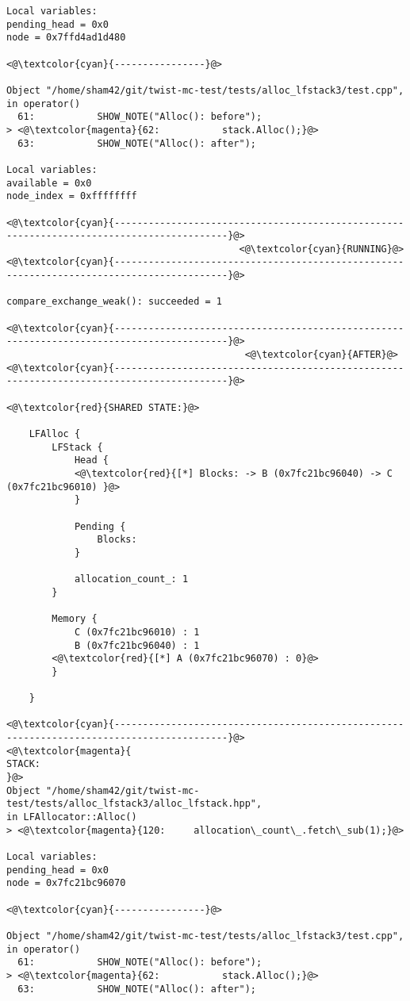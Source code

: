 \begin{adjustwidth}{-3.3cm}{-1cm}
\begin{allintypewriter}
\begin{multicols*}{2}
\begin{lstlisting}[numbers=none]
Local variables: 
pending_head = 0x0
node = 0x7ffd4ad1d480

<@\textcolor{cyan}{----------------}@>

Object "/home/sham42/git/twist-mc-test/tests/alloc_lfstack3/test.cpp",
in operator()
  61:           SHOW_NOTE("Alloc(): before");
> <@\textcolor{magenta}{62:           stack.Alloc();}@>
  63:           SHOW_NOTE("Alloc(): after");

Local variables: 
available = 0x0
node_index = 0xffffffff

<@\textcolor{cyan}{------------------------------------------------------------------------------------------}@>
                                         <@\textcolor{cyan}{RUNNING}@>
<@\textcolor{cyan}{------------------------------------------------------------------------------------------}@>

compare_exchange_weak(): succeeded = 1

<@\textcolor{cyan}{------------------------------------------------------------------------------------------}@>
                                          <@\textcolor{cyan}{AFTER}@>
<@\textcolor{cyan}{------------------------------------------------------------------------------------------}@>

<@\textcolor{red}{SHARED STATE:}@>

    LFAlloc {
	    LFStack {
		    Head {
			<@\textcolor{red}{[*] Blocks: -> B (0x7fc21bc96040) -> C (0x7fc21bc96010) }@>
		    }

		    Pending {
			    Blocks: 
		    }

		    allocation_count_: 1
	    }

	    Memory {
		    C (0x7fc21bc96010) : 1
		    B (0x7fc21bc96040) : 1
		<@\textcolor{red}{[*] A (0x7fc21bc96070) : 0}@>
	    }

    }

<@\textcolor{cyan}{------------------------------------------------------------------------------------------}@>
<@\textcolor{magenta}{
STACK:
}@>
Object "/home/sham42/git/twist-mc-test/tests/alloc_lfstack3/alloc_lfstack.hpp",
in LFAllocator::Alloc()
> <@\textcolor{magenta}{120:     allocation\_count\_.fetch\_sub(1);}@>

Local variables: 
pending_head = 0x0
node = 0x7fc21bc96070

<@\textcolor{cyan}{----------------}@>

Object "/home/sham42/git/twist-mc-test/tests/alloc_lfstack3/test.cpp",
in operator()
  61:           SHOW_NOTE("Alloc(): before");
> <@\textcolor{magenta}{62:           stack.Alloc();}@>
  63:           SHOW_NOTE("Alloc(): after");


\end{lstlisting}
\end{multicols*}
\end{allintypewriter}
\end{adjustwidth}
